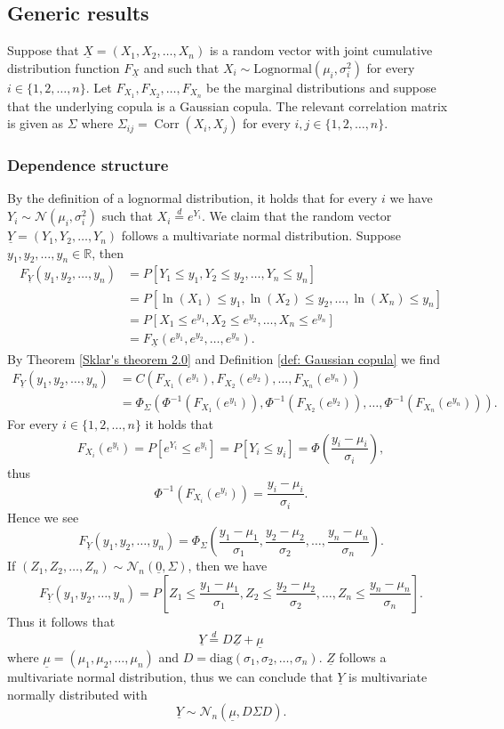 \documentclass{article}
\DeclareMathOperator{\Corr}{Corr}
\begin{document}
\subsection{Generic results}\label{subsection: generic results} %
Suppose that $\underline{X} = (X_1, X_2, \dots, X_n)$ is a random vector with joint cumulative distribution function $F_{\underline{X}}$ and such that $X_i\sim \text{Lognormal}(\mu_i, \sigma_i^2)$ for every $i\in \{1,2,\dots,n\}$. Let $F_{X_1}, F_{X_2}, \dots, F_{X_n}$ be the marginal distributions and suppose that the underlying copula is a Gaussian copula. The relevant correlation matrix is given as $\Sigma$ where $\Sigma_{ij} = \Corr(X_i,X_j)$ for every $i,j\in \{1,2,\dots,n\}$. 
\subsubsection{Dependence structure}
By the definition of a lognormal distribution, it holds that for every $i$ we have $Y_i\sim \mathcal{N}(\mu_i,\sigma_i^2)$ such that $X_i \overset{d}{=} e^{Y_i}$. We claim that the random vector $\underline{Y} = (Y_1,Y_2,\dots,Y_n)$ follows a multivariate normal distribution. Suppose $y_1,y_2,\dots,y_n\in \mathbb{R}$, then 
\begin{align*}
F_{\underline{Y}}(y_1,y_2,\dots,y_n) &= P[Y_1 \leq y_1,Y_2\leq y_2,\dots,Y_n\leq y_n]\\
&= P[\ln(X_1) \leq y_1,\ln(X_2)\leq y_2,\dots,\ln(X_n)\leq y_n]\\
&= P[X_1\leq e^{y_1}, X_2 \leq e^{y_2},\dots,X_n\leq e^{y_n}]\\
&= F_{\underline{X}}(e^{y_1},e^{y_2},\dots,e^{y_n}).
\end{align*}
By Theorem \ref{Sklar's theorem 2.0} and Definition \ref{def: Gaussian copula} we find 
\begin{align*}
    F_{\underline{Y}}(y_1,y_2,\dots,y_n) &= C(F_{X_1}(e^{y_1}),F_{X_2}(e^{y_2}),\dots,F_{X_n}(e^{y_n}))\\
    &= \Phi_\Sigma(\Phi^{-1}(F_{X_1}(e^{y_1})),\Phi^{-1}(F_{X_2}(e^{y_2})),\dots, \Phi^{-1}(F_{X_n}(e^{y_n}))).
\end{align*}
For every $i\in \{1,2,\dots,n\}$ it holds that 
$$F_{X_i}(e^{y_i}) =  P\left[e^{Y_i} \leq e^{y_i}\right] = P[Y_i \leq y_i] = \Phi\left(\frac{y_i - \mu_i}{\sigma_i}\right),$$
thus
$$\Phi^{-1}(F_{X_i}(e^{y_i})) = \frac{y_i - \mu_i}{\sigma_i}. $$
Hence we see
$$F_{\underline{Y}}(y_1,y_2,\dots,y_n) = \Phi_\Sigma\left( \frac{y_1 - \mu_1}{\sigma_1},  \frac{y_2 - \mu_2}{\sigma_2},\dots,  \frac{y_n - \mu_n}{\sigma_n}\right).$$
If $(Z_1,Z_2,\dots,Z_n)\sim\mathcal{N}_n(\underline{0},\Sigma)$, then we have
$$F_{\underline{Y}}(y_1,y_2,\dots,y_n) = P\left[ Z_1 \leq \frac{y_1 - \mu_1}{\sigma_1},  Z_2\leq \frac{y_2 - \mu_2}{\sigma_2},\dots,  Z_n\leq \frac{y_n - \mu_n}{\sigma_n}\right].$$
Thus it follows that 
$$\underline{Y} \overset{d}{=} D\underline{Z} + \underline{\mu}$$
where $\underline{\mu} = (\mu_1,\mu_2,\dots,\mu_n)$ and $D = \text{diag}(\sigma_1,\sigma_2,\dots,\sigma_n)$. $\underline{Z}$ follows a multivariate normal distribution, thus we can conclude that $\underline{Y}$ is multivariate normally distributed with $$\underline{Y}\sim\mathcal{N}_n\left(\underline{\mu}, D\Sigma D\right).$$
\end{document}
